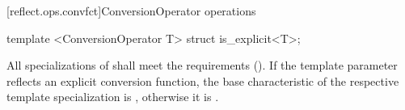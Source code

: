 [reflect.ops.convfct]{ConversionOperator operations}
\begin{std.txt}\color{addclr}
\begin{itemdecl}
template <ConversionOperator T> struct is_explicit<T>;
\end{itemdecl}
\begin{itemdescr}
\pnum
      All specializations of  shall meet the
       requirements (). If the template
      parameter reflects an explicit conversion function, the base
      characteristic of the respective template specialization is
      , otherwise it is .
\end{itemdescr}
\end{std.txt}


